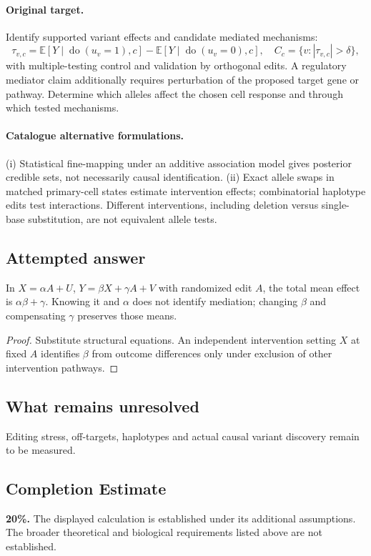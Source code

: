 \documentclass[11pt]{article}
\begin{document}
\paragraph{Original target.}
Identify supported variant effects and candidate mediated mechanisms:
\[
\tau_{v,c}=\mathbb{E}[Y\mid\operatorname{do}(u_v=1),c]-\mathbb{E}[Y\mid\operatorname{do}(u_v=0),c],
\quad C_c=\{v:|\tau_{v,c}|>\delta\},
\]
with multiple-testing control and validation by orthogonal edits. A regulatory mediator claim additionally requires perturbation of the proposed target gene or pathway. Determine which alleles affect the chosen cell response and through which tested mechanisms.
\paragraph{Catalogue alternative formulations.}
(i) Statistical fine-mapping under an additive association model gives posterior credible sets, not necessarily causal identification. (ii) Exact allele swaps in matched primary-cell states estimate intervention effects; combinatorial haplotype edits test interactions. Different interventions, including deletion versus single-base substitution, are not equivalent allele tests.
\subsection{Attempted answer}
\begin{proposition}
In $X=\alpha A+U$, $Y=\beta X+\gamma A+V$ with randomized edit $A$, the total mean effect is $\alpha\beta+\gamma$. Knowing it and $\alpha$ does not identify mediation; changing $\beta$ and compensating $\gamma$ preserves those means.
\end{proposition}
\begin{proof}
Substitute structural equations. An independent intervention setting $X$ at fixed $A$ identifies $\beta$ from outcome differences only under exclusion of other intervention pathways.
\end{proof}
\subsection{What remains unresolved}
Editing stress, off-targets, haplotypes and actual causal variant discovery remain to be measured.
\subsection{Completion Estimate}
\textbf{20\%.} The displayed calculation is established under its additional assumptions. The broader theoretical and biological requirements listed above are not established.
\end{document}
